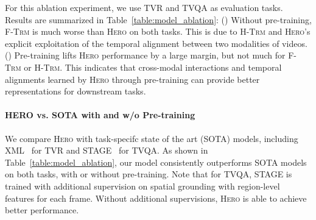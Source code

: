 \documentclass[11pt,a4paper]{article}
\begin{document}
For this ablation experiment, we use TVR and TVQA as evaluation tasks. Results are summarized in Table~\ref{table:model_ablation}: () Without pre-training, \textsc{F-Trm} is much worse than \textsc{Hero} on both tasks. This is due to \textsc{H-Trm} and \textsc{Hero}'s explicit exploitation of the temporal alignment between two modalities of videos. () Pre-training lifts \textsc{Hero} performance by a large margin, but not much for \textsc{F-Trm} or \textsc{H-Trm}. This indicates that cross-modal interactions and temporal alignments learned by \textsc{Hero} through pre-training can provide better representations for downstream tasks. 


\paragraph{HERO vs. SOTA with and w/o Pre-training}
We compare \textsc{Hero} with task-specifc state of the art (SOTA) models, including XML~\citep{lei2020tvr} for TVR and STAGE~\citep{lei2019tvqaplus} for TVQA. 
As shown in Table~\ref{table:model_ablation}, our model consistently outperforms SOTA models on both tasks, with or without pre-training. Note that for TVQA, STAGE is trained with additional supervision on spatial grounding with region-level features for each frame. Without additional supervisions, \textsc{Hero} is able to achieve better performance.

\begin{table}[t!]
\renewcommand\thetable{2}
\centering
{}
\caption{Ablation study on model design, comparing \textsc{Hero} to a flat BERT-like encoder (\textsc{F-Trm}) baseline, a Hierarchical Transformer (\textsc{H-Trm}) baseline, and  task-specific SOTA models on TVR and TVQA val set.}
\label{table:model_ablation}
\vspace{-3mm}
\end{table} 
\end{document}
